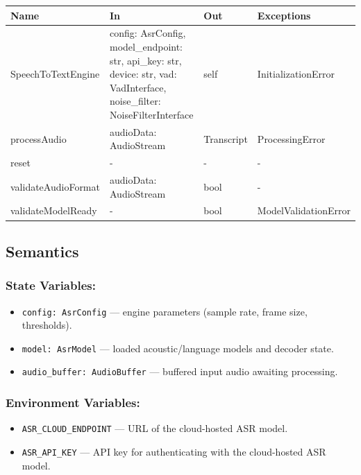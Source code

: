 \documentclass[12pt, titlepage]{article}
\begin{document}
\begin{center}
\begin{tabularx}{\textwidth}{|l|>{\raggedright\arraybackslash\ttfamily}X|l|l|}
\hline
\textbf{Name} & \textbf{In} & \textbf{Out} & \textbf{Exceptions} \\ \hline

SpeechToTextEngine &
config: AsrConfig, model\_endpoint: str, api\_key: str, device: str, vad: VadInterface, noise\_filter: NoiseFilterInterface
& self & InitializationError \\

processAudio & audioData: AudioStream & Transcript & ProcessingError \\
reset & - & - & - \\
validateAudioFormat & audioData: AudioStream & bool & - \\
validateModelReady & - & bool & ModelValidationError \\ \hline
\end{tabularx}
\end{center}


\subsection{Semantics}

\subsubsection{State Variables:}
\begin{itemize}
  \item \texttt{config: AsrConfig} — engine parameters (sample rate, frame size, thresholds).
  \item \texttt{model: AsrModel} — loaded acoustic/language models and decoder state.
  \item \texttt{audio\_buffer: AudioBuffer} — buffered input audio awaiting processing.
\end{itemize}

\subsubsection{Environment Variables:}
\begin{itemize}
  \item \texttt{ASR\_CLOUD\_ENDPOINT} — URL of the cloud-hosted ASR model.
  \item \texttt{ASR\_API\_KEY} — API key for authenticating with the cloud-hosted ASR model.
\end{itemize}
\end{document}
